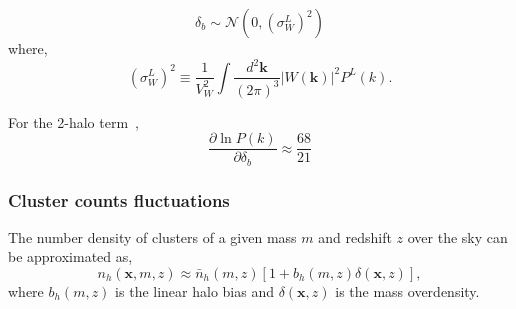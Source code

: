 \documentclass[preprint]{aastex}
\newcommand{\kv}{\mathbf{k}}
\newcommand{\xv}{\mathbf{x}}
\newcommand{\normdist}{\mathcal{N}}
\newcommand{\nbar}{\bar{n}}
\begin{document}
\begin{equation}
	\delta_b \sim \normdist
	\left(0, \left(\sigma_W^L\right)^{2}\right)
\end{equation}
where,
\begin{equation}
	\left(\sigma_{W}^{L}\right)^{2} \equiv
	\frac{1}{V_{W}^{2}} 
	\int \frac{d^{2}\kv}{(2\pi)^3}
	\left|W(\kv)\right|^{2}
	P^{L}(k).
\end{equation}

For the 2-halo term~\citep[eq. 39 of][]{takada2013}, 
\begin{equation}
	\frac{\partial \ln P(k)}{\partial \delta_b} \approx 
	\frac{68}{21}
\end{equation}

\subsubsection{Cluster counts fluctuations}
The number density of clusters of a given mass $m$ and redshift $z$ over the 
sky can be approximated as,
\begin{equation}
	n_{h}(\xv, m, z) \approx \nbar_{h}(m, z)
	\left[1 + b_{h}(m,z) \delta(\xv, z)\right],
\end{equation}
where $b_{h}(m,z)$ is the linear halo bias and
$\delta(\xv,z)$ is the mass overdensity.




\end{document}
